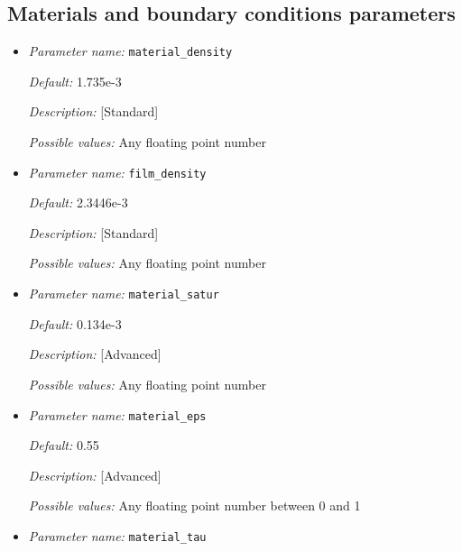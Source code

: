 \subsection{Materials and boundary conditions parameters}
\label{parameters:material}

\begin{itemize}
\item {\it Parameter name:} {\tt material\_density}
\label{parameters:material_density}


{\it Default:} 1.735e-3

{\it Description:} [Standard] 

{\it Possible values:} Any floating point number


\item {\it Parameter name:} {\tt film\_density}
\label{parameters:film_density}


{\it Default:} 2.3446e-3

{\it Description:} [Standard] 

{\it Possible values:} Any floating point number


\item {\it Parameter name:} {\tt material\_satur}
\label{parameters:material_satur}


{\it Default:} 0.134e-3

{\it Description:} [Advanced] 

{\it Possible values:} Any floating point number


\item {\it Parameter name:} {\tt material\_eps}
\label{parameters:material_eps}


{\it Default:} 0.55

{\it Description:} [Advanced] 

{\it Possible values:} Any floating point number between 0 and 1


\item {\it Parameter name:} {\tt material\_tau}
\label{parameters:material_tau}


\end{itemize}

